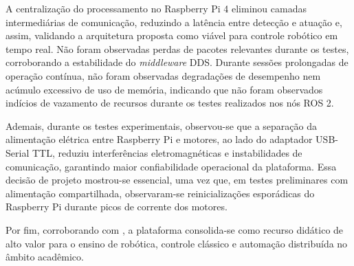 A centralização do processamento no Raspberry Pi 4 eliminou camadas intermediárias de comunicação, reduzindo a latência entre detecção e atuação e, assim, validando a arquitetura proposta como viável para controle robótico em tempo real. Não foram observadas perdas de pacotes relevantes durante os testes, corroborando a estabilidade do \textit{middleware} DDS. Durante sessões prolongadas de operação contínua, não foram observadas degradações de desempenho nem acúmulo excessivo de uso de memória, indicando que não foram observados indícios de vazamento de recursos durante os testes realizados nos nós ROS 2.

Ademais, durante os testes experimentais, observou-se que a separação da alimentação elétrica entre Raspberry Pi e motores, ao lado do adaptador USB-Serial TTL, reduziu interferências eletromagnéticas e instabilidades de comunicação, garantindo maior confiabilidade operacional da plataforma. Essa decisão de projeto mostrou-se essencial, uma vez que, em testes preliminares com alimentação compartilhada, observaram-se reinicializações esporádicas do Raspberry Pi durante picos de corrente dos motores.

Por fim, corroborando com , a plataforma consolida-se como recurso didático de alto valor para o ensino de robótica, controle clássico e automação distribuída no âmbito acadêmico.